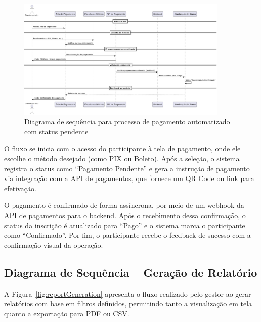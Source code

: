 \begin{figure}[H]
    \centering
    \includegraphics[width=0.9\textwidth]{images/diagramasdesequencias/participantPayment.png}
    \caption{Diagrama de sequência para processo de pagamento automatizado com status pendente}
    \label{fig:participantPaymentAutoV2}
\end{figure}

O fluxo se inicia com o acesso do participante à tela de pagamento, onde ele escolhe o método desejado (como PIX ou Boleto). Após a seleção, o sistema registra o status como “Pagamento Pendente” e gera a instrução de pagamento via integração com a API de pagamentos, que fornece um QR Code ou link para efetivação.

O pagamento é confirmado de forma assíncrona, por meio de um webhook da API de pagamentos para o backend. Após o recebimento dessa confirmação, o status da inscrição é atualizado para “Pago” e o sistema marca o participante como “Confirmado”. Por fim, o participante recebe o feedback de sucesso com a confirmação visual da operação.

\subsection{Diagrama de Sequência – Geração de Relatório}

A Figura~\ref{fig:reportGeneration} apresenta o fluxo realizado pelo gestor ao gerar relatórios com base em filtros definidos, permitindo tanto a visualização em tela quanto a exportação para PDF ou CSV.

